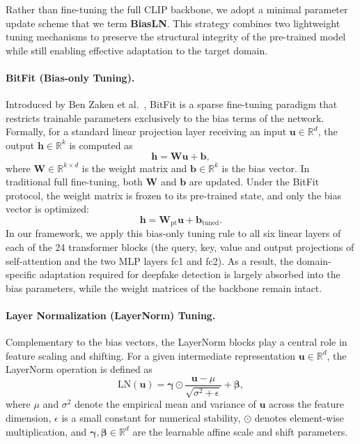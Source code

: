 \documentclass[fonts]{icst}
\newif\ifrevmark\revmarkfalse
\newcommand{\rev}[1]{\ifrevmark{\color{revblue}#1}\else#1\fi}
\begin{document}
Rather than fine-tuning the full CLIP backbone, we adopt a minimal parameter update scheme that we term \textbf{BiasLN}.
This strategy combines two lightweight tuning mechanisms to preserve the structural integrity of the pre-trained model while still enabling effective adaptation to the target domain.

\paragraph{BitFit (Bias-only Tuning).}
Introduced by Ben Zaken et al.~\cite{benzaken2022bitfit}, BitFit is a sparse fine-tuning paradigm that restricts trainable parameters exclusively to the bias terms of the network.
Formally, for a standard linear projection layer receiving an input $\mathbf{u} \in \mathbb{R}^{d}$, the output $\mathbf{h} \in \mathbb{R}^{k}$ is computed as
\begin{equation}
    \mathbf{h} = \mathbf{W}\mathbf{u} + \mathbf{b},
\end{equation}
where $\mathbf{W} \in \mathbb{R}^{k \times d}$ is the weight matrix and $\mathbf{b} \in \mathbb{R}^{k}$ is the bias vector.
In traditional full fine-tuning, both $\mathbf{W}$ and $\mathbf{b}$ are updated.
Under the BitFit protocol, the weight matrix is frozen to its pre-trained state, and only the bias vector is optimized:
\begin{equation}
    \mathbf{h} = \mathbf{W}_{\text{pt}}\mathbf{u} + \mathbf{b}_{\text{tuned}}.
\end{equation}
In our framework, we apply this bias-only tuning rule \rev{to all six linear layers of each of the 24 transformer blocks (the query, key, value and output projections of self-attention and the two MLP layers fc1 and fc2)}.
As a result, the domain-specific adaptation required for deepfake detection is largely absorbed into the bias parameters, while the \rev{weight matrices} of the backbone remain intact.

\paragraph{Layer Normalization (LayerNorm) Tuning.}
Complementary to the bias vectors, the LayerNorm blocks play a central role in feature scaling and shifting.
For a given intermediate representation $\mathbf{u} \in \mathbb{R}^{d}$, the LayerNorm operation is defined as
\begin{equation}
    \mathrm{LN}(\mathbf{u}) = \boldsymbol{\gamma} \odot \frac{\mathbf{u} - \mu}{\sqrt{\sigma^2 + \epsilon}} + \boldsymbol{\beta},
\end{equation}
where $\mu$ and $\sigma^2$ denote the empirical mean and variance of $\mathbf{u}$ across the feature dimension, $\epsilon$ is a small constant for numerical stability, $\odot$ denotes element-wise multiplication, and $\boldsymbol{\gamma}, \boldsymbol{\beta} \in \mathbb{R}^{d}$ are the learnable affine scale and shift parameters.
\end{document}
